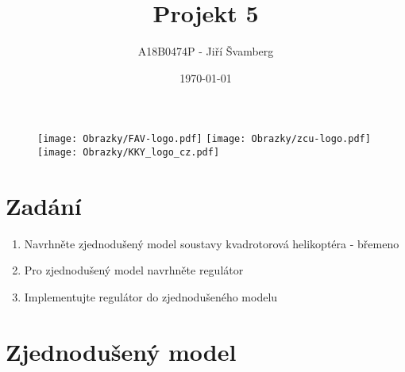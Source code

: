 \documentclass[a4paper, 12pt]{article}
\author{A18B0474P - Jiří Švamberg}
\title{Projekt 5}
\date{\today}
\begin{document}
	\begin{titlepage}
		\maketitle
		\begin{figure}
			\centering
			\texttt{[image: Obrazky/FAV-logo.pdf]}
			\texttt{[image: Obrazky/zcu-logo.pdf]}
			\texttt{[image: Obrazky/KKY\_logo\_cz.pdf]}
		\end{figure}
		\thispagestyle{empty}
		\newpage
	\end{titlepage}

	\tableofcontents
	\newpage
	\section{Zadání}
		\begin{enumerate}
			\item Navrhněte zjednodušený model soustavy kvadrotorová helikoptéra - břemeno\\
			\item Pro zjednodušený model navrhněte regulátor\\
			\item Implementujte regulátor do zjednodušeného modelu\\
		\end{enumerate}
		\clearpage
	\section{Zjednodušený model}
\end{document}
